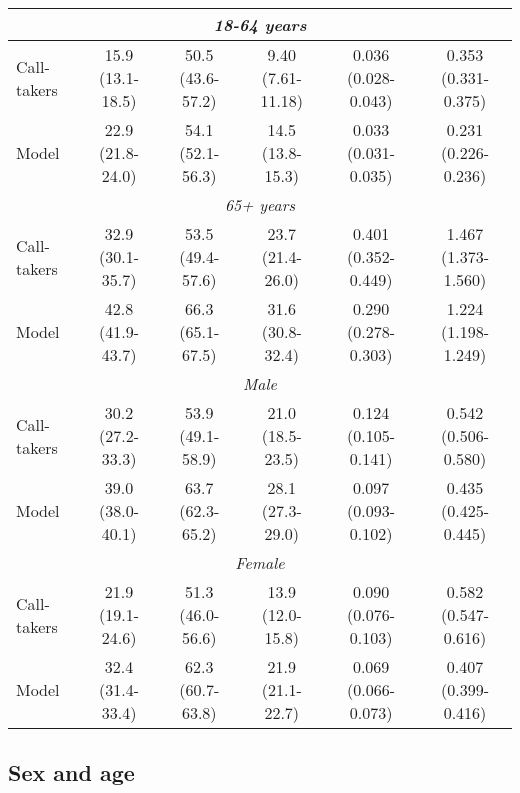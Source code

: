{\begin{table}[t]
{\begin{tabular}{l|ccccc}
        \midrule
        \multicolumn{6}{c}{\emph{18-64 years}} \\
        \midrule
        Call-takers                                 & 15.9 (13.1-18.5) & 50.5 (43.6-57.2) & 9.40 (7.61-11.18) & 0.036 (0.028-0.043) & 0.353 (0.331-0.375) \\
        Model                                       & 22.9 (21.8-24.0) & 54.1 (52.1-56.3) & 14.5 (13.8-15.3) & 0.033 (0.031-0.035) & 0.231 (0.226-0.236) \\ 

        \midrule
        \multicolumn{6}{c}{\emph{65+ years}} \\
        \midrule
        Call-takers                                 & 32.9 (30.1-35.7) & 53.5 (49.4-57.6) & 23.7 (21.4-26.0) & 0.401 (0.352-0.449) & 1.467 (1.373-1.560) \\
        Model                                       & 42.8 (41.9-43.7) & 66.3 (65.1-67.5) & 31.6 (30.8-32.4) & 0.290 (0.278-0.303) & 1.224 (1.198-1.249) \\

        \midrule
        \multicolumn{6}{c}{\emph{Male}} \\
        \midrule
        Call-takers                                 & 30.2 (27.2-33.3) & 53.9 (49.1-58.9) & 21.0 (18.5-23.5) & 0.124 (0.105-0.141) & 0.542 (0.506-0.580) \\
        Model                                       & 39.0 (38.0-40.1) & 63.7 (62.3-65.2) & 28.1 (27.3-29.0) & 0.097 (0.093-0.102) & 0.435 (0.425-0.445) \\

        \midrule
        \multicolumn{6}{c}{\emph{Female}} \\
        \midrule
        Call-takers                                 & 21.9 (19.1-24.6) & 51.3 (46.0-56.6) & 13.9 (12.0-15.8) & 0.090 (0.076-0.103) & 0.582 (0.547-0.616) \\
        Model                                       & 32.4 (31.4-33.4) & 62.3 (60.7-63.8) & 21.9 (21.1-22.7) & 0.069 (0.066-0.073) & 0.407 (0.399-0.416) \\
        
        \bottomrule
    \end{tabular}%
    }
\end{table}


\subsection{Sex and age}

}
